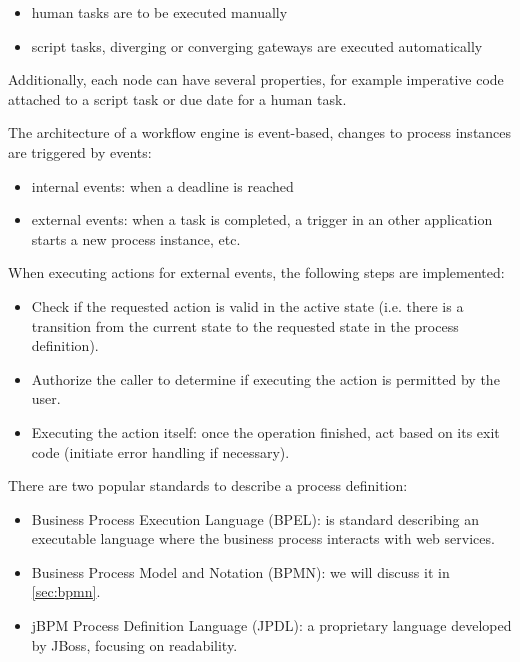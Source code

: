\begin{itemize}
\item human tasks are to be executed manually
\item script tasks, diverging or converging gateways are executed automatically
\end{itemize}

Additionally, each node can have several properties, for example imperative code
attached to a script task or due date for a human task.

The architecture of a workflow engine is event-based, changes to process
instances are triggered by events:

\begin{itemize}
\item internal events: when a deadline is reached
\item external events: when a task is completed, a trigger in an other
application starts a new process instance, etc.
\end{itemize}

When executing actions for external events, the following steps are implemented:

\begin{itemize}
\item Check if the requested action is valid in the active state (i.e. there is a transition from the current state to the requested state in the process definition).
\item Authorize the caller to determine if executing the action is permitted by the user.
\item Executing the action itself: once the operation finished, act based on its exit code (initiate error handling if necessary).
\end{itemize}

There are two popular standards to describe a process definition:

\begin{itemize}
\item Business Process Execution Language (BPEL): is standard describing an
executable language where the business process interacts with web services.
\item Business Process Model and Notation (BPMN): we will discuss it in \autoref{sec:bpmn}.
\item jBPM Process Definition Language (JPDL): a proprietary language developed
by JBoss, focusing on readability.
\end{itemize}

